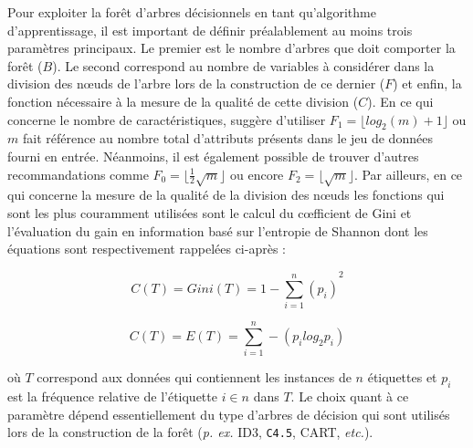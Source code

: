Pour exploiter la forêt d'arbres décisionnels en tant qu'algorithme d'apprentissage, il est important de définir préalablement au moins trois paramètres principaux. Le premier est le nombre d'arbres que doit comporter la forêt ($B$). Le second correspond au nombre de variables à considérer dans la division des n\oe{}uds de l'arbre lors de la construction de ce dernier ($F$) et enfin, la fonction nécessaire à la mesure de la qualité de cette division ($C$). En ce qui concerne le nombre de caractéristiques, \citeauthor{Breiman2001} suggère d'utiliser $F_1=\lfloor log_2(m) + 1\rfloor$ ou $m$ fait référence au nombre total d'attributs présents dans le jeu de données fourni en entrée. Néanmoins, il est également possible de trouver d'autres recommandations comme $F_0=\lfloor \frac{1}{2}\sqrt{m}\rfloor$ ou encore $F_2=\lfloor \sqrt{m}\rfloor$. Par ailleurs, en ce qui concerne la mesure de la qualité de la division des n\oe{}uds les fonctions qui sont les plus couramment utilisées sont le calcul du c\oe{}fficient de Gini et l'évaluation du gain en information basé sur l'entropie de Shannon dont les équations sont respectivement rappelées ci-après :

\begin{equation}
	\label{eq:gini}
	C(T) = Gini(T) = {1-\sum_{i=1}^{n}(p_i)}^2
\end{equation}

\begin{equation}
	\label{eq:gain}
	C(T) = E(T) = \sum_{i=1}^{n}-(p_i log_2 p_i)
\end{equation}

\noindent où $T$ correspond aux données qui contiennent les instances de $n$ étiquettes et $p_i$ est la fréquence relative de l'étiquette $i \in n$ dans $T$. Le choix quant à ce paramètre dépend essentiellement du type d'arbres de décision qui sont utilisés lors de la construction de la forêt (\textit{p. ex.} ID3, \texttt{C4.5}, CART, \textit{etc.}).

